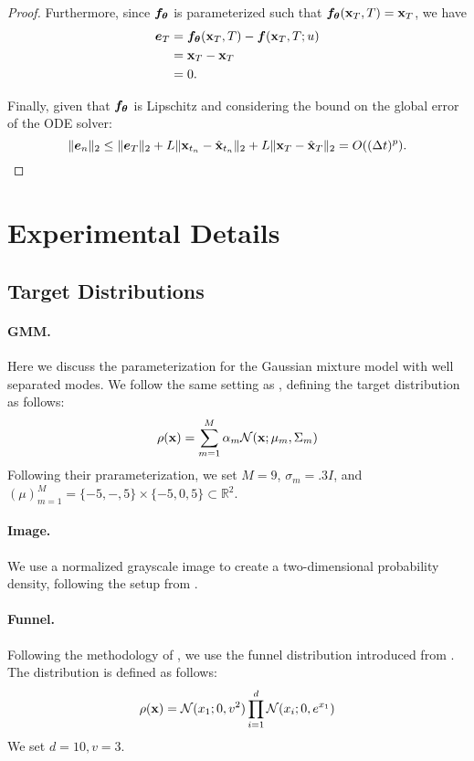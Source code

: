 \begin{proof}
    Furthermore, since ${\bm{f}}_{\bm{\theta}}$ is parameterized such that ${\bm{f}}_{\bm{\theta}}({\mathbf{x}}_{T}, T) = {\mathbf{x}}_{T}$, we have
    \begin{align*}
        {\bm{e}}_T &= {\bm{f}}_{\bm{\theta}}({\mathbf{x}}_{T}, T) - {\bm{f}}({\mathbf{x}}_{T}, T; u) \\ 
        &= {\mathbf{x}}_{T} - {\mathbf{x}}_{T}\\
        &= 0.
    \end{align*}

    Finally, given that ${\bm{f}}_{\bm{\theta}}$ is Lipschitz and considering the bound on the global error of the ODE solver:
    \begin{equation*}
        \|{\bm{e}}_n\|_2 \leq \|{\bm{e}}_T\|_2 + L\|{\mathbf{x}}_{t_n} - \hat{{\mathbf{x}}}_{t_n} \|_2 + L\|{\mathbf{x}}_{T} - \hat{{\mathbf{x}}}_{T} \|_2
        = O((\Delta t)^p).
    \end{equation*}
\end{proof}


\section{Experimental Details}\label{sec:details}
\subsection{Target Distributions}
\paragraph{GMM.}
Here we discuss the parameterization for the Gaussian mixture model with well separated modes. 
We follow the same setting as \citet{zhang2022pis, berner2024dis}, defining the target distribution as follows: 
\begin{equation*}
    \rho({\mathbf{x}}) = \sum_{m=1}^{M} \alpha_m \mathcal{N}({\mathbf{x}}; \mu_m, \Sigma_m)
\end{equation*}
Following their prarameterization, we set $M=9$, $\sigma_m = .3 I$, and $(\mu)_{m=1}^M = \{-5, -, 5\} \times \{-5, 0, 5\} \subset \mathbb{R}^2$.


\paragraph{Image.}
We use a normalized grayscale image to create a two-dimensional probability density, following the setup from \citet{wu2020snf}. 

\paragraph{Funnel.}
Following the methodology of \citet{berner2024dis}, we use the funnel distribution introduced from \citet{neal2003slice}. The distribution is defined as follows: 
\begin{equation*}
    \rho({\mathbf{x}}) = \mathcal{N}(x_1; 0, v^2) \prod_{i=1}^d \mathcal{N}(x_i; 0, e^{x_1})
\end{equation*}
We set $d=10, v=3$. 

